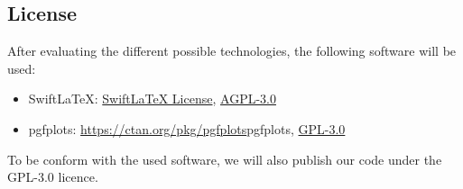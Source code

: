 \subsection{License}
After evaluating the different possible technologies, the following software will be used:
\begin{itemize}
    \item SwiftLaTeX: \href{https://github.com/SwiftLaTeX/SwiftLaTeX/blob/master/LICENSE}{SwiftLaTeX License}, \href{https://www.gnu.org/licenses/agpl-3.0.en.html}{AGPL-3.0}
    \item pgfplots: \href{https://ctan.org/pkg/pgfplots}{https://ctan.org/pkg/pgfplots}{pgfplots}, \href{https://www.gnu.org/licenses/gpl-3.0.en.html}{GPL-3.0}
\end{itemize}
To be conform with the used software, we will also publish our code under the GPL-3.0 licence.
